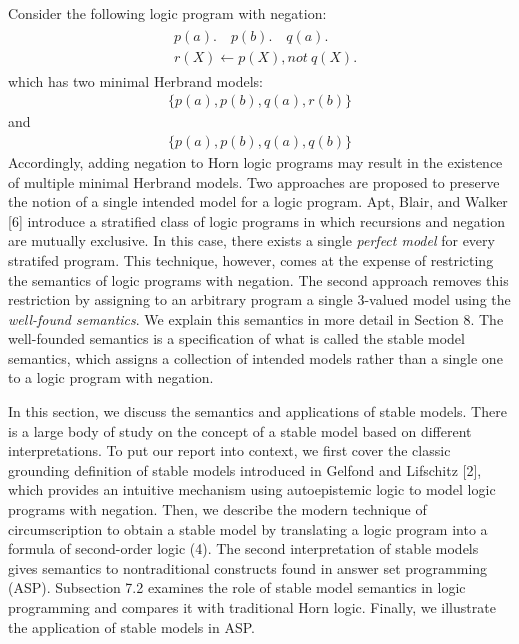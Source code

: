 Consider the following logic program with negation:
\begin{align}
    \begin{split}
        & p(a). \hspace{1em} p(b). \hspace{1em} q(a). \\
        & r(X) \leftarrow p(X), not \: q(X).
    \end{split}
\end{align}
which has two minimal Herbrand models:
\begin{align*}
    \{p(a),p(b),q(a),r(b)\}
\end{align*}
and 
\begin{align*}
    \{p(a),p(b),q(a),q(b)\}
\end{align*}
Accordingly, adding negation to Horn logic programs may result in the existence of multiple minimal Herbrand models. 
Two approaches are proposed to preserve the notion of a single intended model for a logic program. 
Apt, Blair, and Walker [6] introduce a stratified class of logic programs in which recursions and negation are 
mutually exclusive. In this case, there exists a single \emph{perfect model} for every stratifed program. 
This technique, however, comes at the expense of restricting the semantics of logic programs with negation. 
The second approach removes this restriction by assigning to an arbitrary program a single 3-valued 
model using the \emph{well-found semantics}. We explain this semantics in more detail in Section 8. The 
well-founded semantics is a specification of what is called the stable model semantics, which 
assigns a collection of intended models rather than a single one to a logic program with negation.

In this section, we discuss the semantics and applications of stable models. There is a large body 
of study on the concept of a stable model based on different interpretations. To put our report into 
context, we first cover the classic grounding definition of stable models introduced in Gelfond and Lifschitz [2], 
which provides an intuitive mechanism using autoepistemic logic to model logic programs with negation. 
Then, we describe the modern  
technique of circumscription to obtain a stable model by translating a logic program 
into a formula of second-order logic (4). The second interpretation of stable models gives semantics 
to nontraditional constructs found in answer set programming (ASP). Subsection 7.2 examines the role of 
stable model semantics in logic programming and compares it with traditional Horn logic. Finally, 
we illustrate the application of stable models in ASP. 
 
